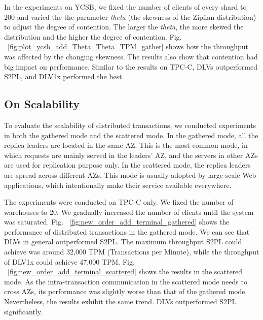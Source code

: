 \documentclass[conference]{IEEEtran}
\begin{document}
In the experiments on YCSB, we fixed the number of clients of every shard to 200 and varied the the parameter \emph{theta} (the skewness of the Zipfian distribution) to adjust the degree of contention.
The larger the \emph{theta}, the more skewed the distribution and the higher the degree of contention. 
Fig. ~\ref{fig:plot_ycsb_add_Theta_Theta_TPM_gather} shows how the throughput was affected by the changing skewness.
The results also show that contention had big impact on performance.
Similar to the results on TPC-C, DLVs outperformed S2PL, and DLV1x performed the best.

\subsection{On Scalability}

To evaluate the scalability of distributed transactions, we conducted experiments in both the gathered mode and the scattered mode.
In the gathered mode, all the replica leaders are located in the same AZ. 
This is the most common mode, in which requests are mainly served in the leaders' AZ, and the servers in other AZs are used for replication purpose only. 
In the scattered mode, the replica leaders are spread across different AZs. 
This mode is usually adopted by large-scale Web applications, which intentionally make their service available everywhere.

The experiments were conducted on TPC-C only. We fixed the number of warehouses to 20. We gradually increased the number of clients until the system was saturated. 
Fig. ~\ref{fig:new_order_add_terminal_gathered} shows the performance of distributed transactions in the gathered mode.
We can see that DLVs in general outperformed S2PL. The maximum throughput S2PL could achieve was around 32,000 TPM (Transactions per Minute), 
while the throughput of DLV1x could achieve 47,000 TPM. 
Fig. ~\ref{fig:new_order_add_terminal_scattered} shows the results in the scattered mode. 
As the intra-transaction communication in the scattered mode needs to cross AZs, its performance was slightly worse than that of the gathered mode.
Nevertheless, the results exhibit the same trend. DLVs outperformed S2PL significantly.
\end{document}
